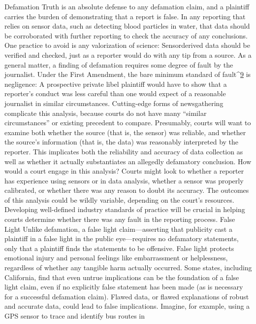 Defamation
Truth is an absolute defense to any defamation claim, and a plaintiff carries
the burden of demonstrating that a report is false. In any reporting that
relies on sensor data, such as detecting blood particles in water, that data
should be corroborated with further reporting to check the accuracy of any
conclusions. One practice to avoid is any valorization of science: Sensorderived
data should be verified and checked, just as a reporter would do
with any tip from a source.
As a general matter, a finding of defamation requires some degree of fault by
the journalist. Under the First Amendment, the bare minimum standard of
fault^{\href{#endnotes-syed}{9}} is negligence: A prospective private libel plaintiff would have to show
that a reporter's conduct was less careful than one would expect of a reasonable
journalist in similar circumstances. Cutting-edge forms of newsgathering
complicate this analysis, because courts do not have many ``similar
circumstances'' or existing precedent to compare. Presumably, courts will
want to examine both whether the source (that is, the sensor) was reliable,
and whether the source's information (that is, the data) was reasonably
interpreted by the reporter. This implicates both the reliability and accuracy
of data collection as well as whether it actually substantiates an allegedly
defamatory conclusion.
How would a court engage in this analysis? Courts might look to whether
a reporter has experience using sensors or in data analysis, whether a sensor
was properly calibrated, or whether there was any reason to doubt its
accuracy. The outcomes of this analysis could be wildly variable, depending on the court's resources. Developing well-defined industry standards of
practice will be crucial in helping courts determine whether there was any
fault in the reporting process.
False Light
Unlike defamation, a false light claim—asserting that publicity cast a plaintiff
in a false light in the public eye—requires no defamatory statements,
only that a plaintiff finds the statements to be offensive. False light protects
emotional injury and personal feelings like embarrassment or helplessness,
regardless of whether any tangible harm actually occurred. Some states,
including California, find that even untrue implications can be the foundation
of a false light claim, even if no explicitly false statement has been made
(as is necessary for a successful defamation claim). Flawed data, or flawed
explanations of robust and accurate data, could lead to false implications.
Imagine, for example, using a GPS sensor to trace and identify bus routes in
